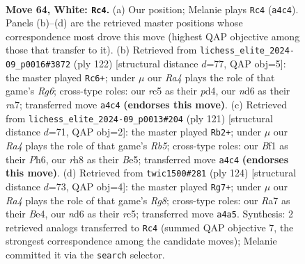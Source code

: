 \documentclass[11pt]{article}
\begin{document}
\clearpage

\begin{figure}[p]\centering
\begin{subfigure}{0.46\textwidth}\centering
\resizebox{\linewidth}{!}{%
\newchessgame
\chessboard[
  setfen={4k2r/R6p/P2n4/2r5/R7/1Pp3KP/2P3P1/5B2 w - - 5 64},
  showmover=false,
  pgfstyle=straightmove, color=movearrow, markmove={a4-c4}
]}
\caption{}
\end{subfigure}\hfill
\begin{subfigure}{0.46\textwidth}\centering
\resizebox{\linewidth}{!}{%
\newchessgame
\chessboard[
  setfen={5R2/r1k4r/6R1/1B1KP3/Pp1p4/3P4/2P5/8 w - - 21 62},
  showmover=false,
  pgfstyle=straightmove, color=movearrow, markmove={g6-c6}
]}
\caption{}
\end{subfigure}
\\[4pt]
\begin{subfigure}{0.46\textwidth}\centering
\resizebox{\linewidth}{!}{%
\newchessgame
\chessboard[
  setfen={8/8/1k3p1p/1p2bP1P/1r2p3/6p1/2K1N1R1/8 b - - 1 61},
  showmover=false,
  pgfstyle=straightmove, color=movearrow, markmove={b4-b2}
]}
\caption{}
\end{subfigure}\hfill
\begin{subfigure}{0.46\textwidth}\centering
\resizebox{\linewidth}{!}{%
\newchessgame
\chessboard[
  setfen={6R1/2k5/3n1p1p/2rP3P/4B1P1/4KP2/1p6/8 w - - 4 63},
  showmover=false,
  pgfstyle=straightmove, color=movearrow, markmove={g8-g7}
]}
\caption{}
\end{subfigure}
\caption{\textbf{Move 64, White: \texttt{Rc4}.} (a) Our position; Melanie plays \texttt{Rc4} (\texttt{a4c4}). Panels (b)--(d) are the retrieved master positions whose correspondence most drove this move (highest QAP objective among those that transfer to it). (b) Retrieved from \texttt{lichess\_elite\_2024-09\_p0016\#3872} (ply 122) [structural distance $d$=77, QAP obj=5]: the master played \texttt{Rc6+}; under $\mu$ our \emph{Ra4} plays the role of that game's \emph{Rg6}; cross-type roles: our \emph{r}c5 as their \emph{p}d4, our \emph{n}d6 as their \emph{r}a7; transferred move \texttt{a4c4} \textbf{(endorses this move)}. (c) Retrieved from \texttt{lichess\_elite\_2024-09\_p0013\#204} (ply 121) [structural distance $d$=71, QAP obj=2]: the master played \texttt{Rb2+}; under $\mu$ our \emph{Ra4} plays the role of that game's \emph{Rb5}; cross-type roles: our \emph{B}f1 as their \emph{P}h6, our \emph{r}h8 as their \emph{B}e5; transferred move \texttt{a4c4} \textbf{(endorses this move)}. (d) Retrieved from \texttt{twic1500\#281} (ply 124) [structural distance $d$=73, QAP obj=4]: the master played \texttt{Rg7+}; under $\mu$ our \emph{Ra4} plays the role of that game's \emph{Rg8}; cross-type roles: our \emph{R}a7 as their \emph{B}e4, our \emph{n}d6 as their \emph{r}c5; transferred move \texttt{a4a5}. Synthesis: 2 retrieved analogs transferred to \texttt{Rc4} (summed QAP objective 7, the strongest correspondence among the candidate moves); Melanie committed it via the \texttt{search} selector.}
\label{fig:thought-m126}
\end{figure}
\end{document}
